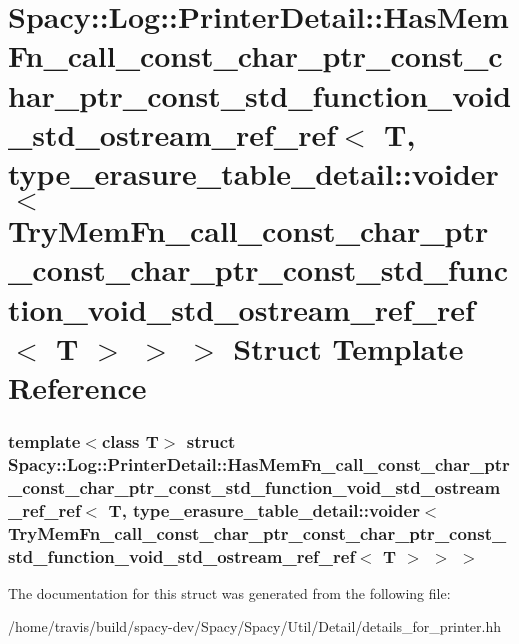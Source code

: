 \hypertarget{structSpacy_1_1Log_1_1PrinterDetail_1_1HasMemFn__call__const__char__ptr__const__char__ptr__constedca53a3dee62b8f9238fde64df8057e}{\section{\-Spacy\-:\-:\-Log\-:\-:\-Printer\-Detail\-:\-:\-Has\-Mem\-Fn\-\_\-call\-\_\-const\-\_\-char\-\_\-ptr\-\_\-const\-\_\-char\-\_\-ptr\-\_\-const\-\_\-std\-\_\-function\-\_\-void\-\_\-std\-\_\-ostream\-\_\-ref\-\_\-ref$<$ \-T, type\-\_\-erasure\-\_\-table\-\_\-detail\-:\-:voider$<$ \-Try\-Mem\-Fn\-\_\-call\-\_\-const\-\_\-char\-\_\-ptr\-\_\-const\-\_\-char\-\_\-ptr\-\_\-const\-\_\-std\-\_\-function\-\_\-void\-\_\-std\-\_\-ostream\-\_\-ref\-\_\-ref$<$ \-T $>$ $>$ $>$ \-Struct \-Template \-Reference}
\label{structSpacy_1_1Log_1_1PrinterDetail_1_1HasMemFn__call__const__char__ptr__const__char__ptr__constedca53a3dee62b8f9238fde64df8057e}
}
\subsubsection*{template$<$class T$>$ struct Spacy\-::\-Log\-::\-Printer\-Detail\-::\-Has\-Mem\-Fn\-\_\-call\-\_\-const\-\_\-char\-\_\-ptr\-\_\-const\-\_\-char\-\_\-ptr\-\_\-const\-\_\-std\-\_\-function\-\_\-void\-\_\-std\-\_\-ostream\-\_\-ref\-\_\-ref$<$ T, type\-\_\-erasure\-\_\-table\-\_\-detail\-::voider$<$ Try\-Mem\-Fn\-\_\-call\-\_\-const\-\_\-char\-\_\-ptr\-\_\-const\-\_\-char\-\_\-ptr\-\_\-const\-\_\-std\-\_\-function\-\_\-void\-\_\-std\-\_\-ostream\-\_\-ref\-\_\-ref$<$ T $>$ $>$ $>$}



\-The documentation for this struct was generated from the following file\-:\begin{DoxyCompactItemize}
\item 
/home/travis/build/spacy-\/dev/\-Spacy/\-Spacy/\-Util/\-Detail/details\-\_\-for\-\_\-printer.\-hh\end{DoxyCompactItemize}
